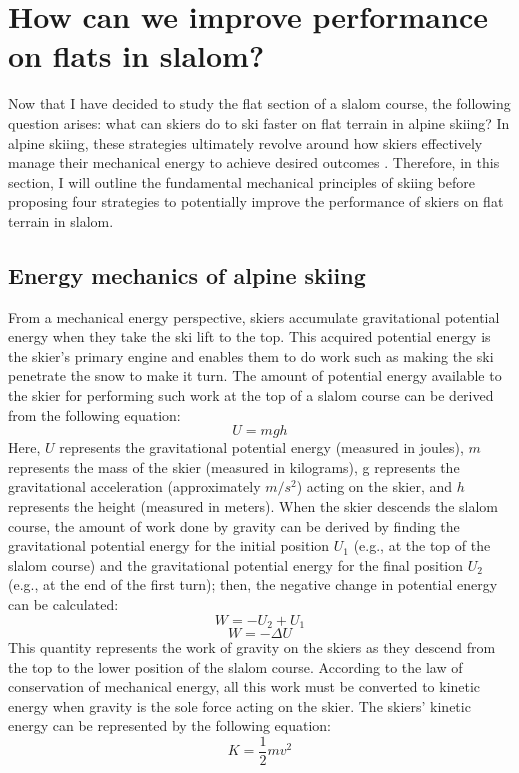 \section{How can we improve performance on flats in slalom?}
Now that I have decided to study the flat section of a slalom course, the following question arises: what can skiers do to ski faster on flat terrain in alpine skiing? In alpine skiing, these strategies ultimately revolve around how skiers effectively manage their mechanical energy to achieve desired outcomes \cite{supej_differential_2008, supej_how_2010}. Therefore, in this section, I will outline the fundamental mechanical principles of skiing before proposing four strategies to potentially improve the performance of skiers on flat terrain in slalom.

\subsection{Energy mechanics of alpine skiing}
From a mechanical energy perspective, skiers accumulate gravitational potential energy when they take the ski lift to the top. This acquired potential energy is the skier's primary engine \cite{supej_differential_2008, supej_mechanical_2011} and enables them to do work such as making the ski penetrate the snow to make it turn. The amount of potential energy available to the skier for performing such work at the top of a slalom course can be derived from the following equation:
\[U=mgh\]
Here, $U$ represents the gravitational potential energy (measured in joules), $m$ represents the mass of the skier (measured in kilograms), g represents the gravitational acceleration (approximately $m/s^2$) acting on the skier, and $h$ represents the height (measured in meters). When the skier descends the slalom course, the amount of work done by gravity can be derived by finding the gravitational potential energy for the initial position $U_1$ (e.g., at the top of the slalom course) and the gravitational potential energy for the final position $U_2$ (e.g., at the end of the first turn); then, the negative change in potential energy can be calculated: 
\[W=-U_2 + U_1\]
\[W= -\Delta U \]
This quantity represents the work of gravity on the skiers as they descend from the top to the lower position of the slalom course. According to the law of conservation of mechanical energy, all this work must be converted to kinetic energy when gravity is the sole force acting on the skier. The skiers' kinetic energy can be represented by the following equation:
\[ K = \frac{1}{2} m v^2 \]
